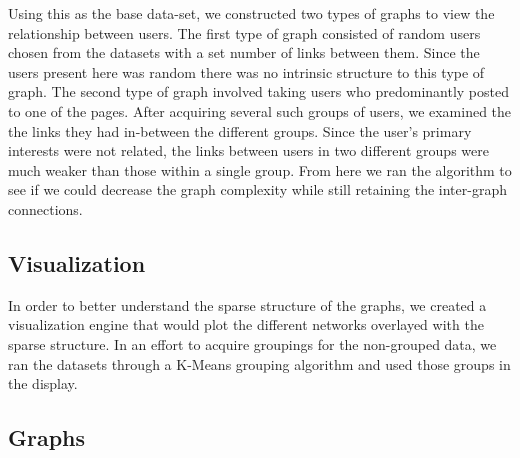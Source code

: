 \documentclass{article}
\begin{document}
Using this as the base data-set, we constructed two types of graphs to view the relationship between users. The first type of graph consisted of random users chosen from the datasets with a set number of links between them. Since the users present here was random there was no intrinsic structure to this type of graph. The second type of graph involved taking users who predominantly posted to one of the pages. After acquiring several such groups of users, we examined the the links they had in-between the different groups. Since the user's primary interests were not related, the links between users in two different groups were much weaker than those within a single group. From here we ran the algorithm to see if we could decrease the graph complexity while still retaining the inter-graph connections.

\subsection{Visualization}
In order to better understand the sparse structure of the graphs, we created a visualization engine that would plot the different networks overlayed with the sparse structure. In an effort to acquire groupings for the non-grouped data, we ran the datasets through a K-Means grouping algorithm and used those groups in the display.

\subsection{Graphs}
\end{document}
